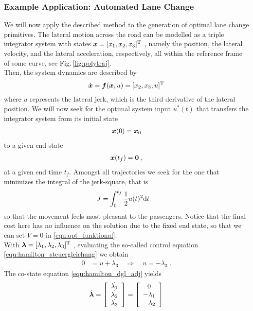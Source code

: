 \subsubsection{Example Application: Automated Lane Change}\label{S:57.3.1.2}
We will now apply the described method to the generation of optimal lane change primitives. The lateral motion across the road can be modelled as a triple integrator system with states $\bs x = [x_1, x_2, x_3]^\T$ , namely the position, the lateral velocity, and the lateral acceleration, respectively, all within the reference frame of some curve, see Fig.\,\ref{fig:polytraj}. \\
Then, the system dynamics are described by 
\begin{align}
	\dot{\bs x} = \bs f(\bs x, u) = [x_2, x_3, u ]^\T
	\label{equ:stateeqlc}
\end{align}
where $u$ represents the lateral jerk, which is the third derivative of the lateral position. We will now seek for the optimal system input $u^\ast (t)$  that transfers the integrator system from its initial state
\begin{align}
	\bs x(0) = \bs x_0 \label{equ:x_0}
\end{align}
to a given end state 
\begin{align}
\bs x(t_f) = \bs 0 \;, \label{equ:x_f}
\end{align}
at a given end time $t_f$. Amongst all trajectories we seek for the one that minimizes the integral of the jerk-square, that is
\begin{align}
	J &= %
	\int_{0}^{t_f}\frac{1}{2} u(t)^2 {\rm d} t \label{equ:integrator_J}
\end{align}
so that the movement feels most pleasant to the passengers. Notice that the final cost here has no influence on the solution due to the fixed end state, so that we can set $V=0$ in \eqref{equ:opt_funktional}. \\
With $\bs \lambda =[\lambda_1, \lambda_2, \lambda_3]^\T$ , evaluating the so-called control equation \eqref{equ:hamilton_steuergleichung} we obtain
\begin{align}
	0 &=  u + \lambda_3 \quad \Rightarrow \quad u = -\lambda_3 \;. \label{equ:integrator_u}
\end{align}
The co-state equation \eqref{equ:hamilton_dgl_adj} yields
\begin{align*}
	\dot {\bs \lambda} = 
	\mtrx{c}{\dot{\lambda_1} \\ \dot{\lambda_2} \\ \dot{\lambda_3}}=
	\mtrx{c}{0 \\ -\lambda_1 \\ -\lambda_2}
\end{align*}
